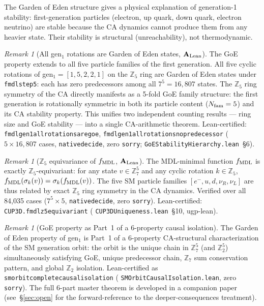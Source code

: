 \documentclass[11pt]{article}
\theoremstyle{remark}
\newtheorem{remark}[theorem]{Remark}
\newcommand{\lean}[1]{%
  \penalty-100
  \begingroup\def\_{\textunderscore\allowbreak}\texttt{#1}\endgroup}
\newcommand{\CatAL}{\ensuremath{\textbf{A}_{\rm Lean}}}
\begin{document}
The Garden of Eden structure gives a physical explanation of generation-1 stability:
first-generation particles (electron, up quark, down quark, electron neutrino) are
stable because the CA dynamics cannot produce them from any heavier state. Their
stability is structural (unreachability), not thermodynamic.

\begin{remark}[All gen$_1$ rotations are Garden of Eden states, $\CatAL$]
\label{rem:all_rotations_goe}
The GoE property extends to all five particle families of the first generation.
All five cyclic rotations of gen$_1 = [1,5,2,2,1]$ on the $\mathbb{Z}_5$ ring are
Garden of Eden states under \lean{fmdl\_step5}: each has zero predecessors among
all $7^5 = 16{,}807$ states.
The $\mathbb{Z}_5$ ring symmetry of the CA directly manifests as a 5-fold GoE family
structure: the first generation is rotationally symmetric in both its particle content
($N_{\rm fam} = 5$) and its CA stability property.
This unifies two independent counting results --- ring size and GoE stability ---
into a single CA-arithmetic theorem.
Lean-certified: \lean{fmdl\_gen1\_all\_rotations\_are\_goe},
\lean{fmdl\_gen1\_all\_rotations\_no\_predecessor}
($5 \times 16{,}807$ cases, \lean{native\_decide}, zero \texttt{sorry};
\lean{GoEStability\-Hierarchy.lean}~\S6).
\end{remark}

\begin{remark}[$\mathbb{Z}_5$ equivariance of $f_{\rm MDL}$, $\CatAL$]
\label{rem:z5_equivariance}
The MDL-minimal function $f_{\rm MDL}$ is exactly $\mathbb{Z}_5$-equivariant:
for any state $v \in \mathbb{Z}_7^5$ and any cyclic rotation $k \in \mathbb{Z}_5$,
$f_{\rm MDL}(\sigma_k(v)) = \sigma_k(f_{\rm MDL}(v))$.
The five SM particle families $[e^-, u, d, \nu_R, \nu_L]$ are thus related
by exact $\mathbb{Z}_5$ ring symmetry in the CA dynamics.
Verified over all 84{,}035 cases ($7^5 \times 5$, \lean{native\_decide}, zero \texttt{sorry}).
Lean-certified: \lean{CUP3D.fmdl\_z5\_equivariant}
(\lean{CUP3DUniqueness.lean}~\S10, ugp-lean).
\end{remark}

\begin{remark}[GoE property as Part~1 of a 6-property causal isolation]
\label{rem:goe_part1}
The Garden of Eden property of gen$_1$ is Part~1 of a 6-property CA-structural
characterization of the SM generation orbit: the orbit is the unique chain in $\mathbb{Z}_7^5$
(and $\mathbb{Z}_2^5$) simultaneously satisfying GoE, unique predecessor chain, $\mathbb{Z}_7$
sum conservation pattern, and global $\mathbb{Z}_2$ isolation.
Lean-certified as \lean{sm\_orbit\_complete\_causal\_isolation}
(\lean{SMOrbit\-Causal\-Isolation.lean}, zero \texttt{sorry}).
The full 6-part master theorem is developed in a companion paper (see~\S\ref{sec:open}
for the forward-reference to the deeper-consequences treatment).
\end{remark}
\end{document}
